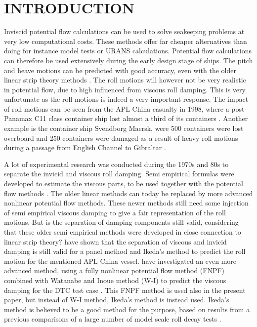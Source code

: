\section*{INTRODUCTION}\label{introduction}

Inviscid potential flow calculations can be used to solve seakeeping
problems at very low computational costs. These methods offer far
cheaper alternatives than doing for instance model tests or URANS
calculations. Potential flow calculations can therefore be used
extensively during the early design stage of ships. The pitch and heave
motions can be predicted with good accuracy, even with the older linear
strip theory methods \citep{7505983/FB64RGPF}. The roll motions will
however not be very realistic in potential flow, due to high influenced
from viscous roll damping. This is very unfortunate as the roll motions
is indeed a very important response. The impact of roll motions can be
seen from the APL China casualty in 1998, where a post-Panamax C11 class
container ship lost almost a third of its containers
\citep{7505983/WPADAQB3}. Another example is the container ship Svendborg
Maersk, were 500 containers were lost overboard and 250 containers were
damaged as a result of heavy roll motions during a passage from English
Channel to Gibraltar \citep{7505983/T78CMTDR}.

\quad A lot of experimental research was conducted during the 1970s and
80s to separate the invicid and viscous roll damping. Semi empirical
formulas were developed to estimate the viscous parts, to be used
together with the potential flow methods \citep{7505983/937PN5DT}. The
older linear methods can today be replaced by more advanced nonlinear
potential flow methods. These newer methods still need some injection of
semi empirical viscous damping to give a fair representation of the roll
motions. But is the separation of damping components still valid,
considering that these older semi empirical methods were developed in
close connection to linear strip theory? \citep{7505983/UGK6YEVD} have
shown that the separation of viscous and invicid damping is still valid
for a panel method and Ikeda's method to predict the roll motion for the
mentioned APL China vessel. \citep{7505983/24TNAV5Z} have investigated an
even more advanced method, using a fully nonlinear potential flow method
(FNPF) \citep{7505983/P4XDUMMQ} combined with Watanabe and Inoue method
(W-I) \citep{7505983/ARMIRMVY} to predict the viscous damping for the DTC
test case \citep{7505983/BYNJ8CFG}. This FNPF method is used also in the
present paper, but instead of W-I method, Ikeda's method is instead
used. Ikeda's method is believed to be a good method for the purpose,
based on results from a previous comparisons of a large number of model
scale roll decay tests \citep{7505983/QMGQ76Q9}.

